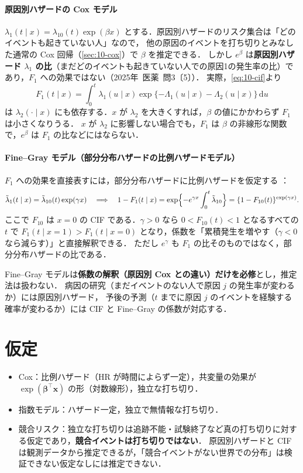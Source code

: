 \documentclass[a4paper,11pt,openany]{ltjsbook}
\newcommand{\kakomon}[2]{\mbox{#1年 医薬 問#2}}
\newcommand{\dd}{\mathrm{d}}
\newcommand{\transp}{^{\top}}
\begin{document}
\paragraph{原因別ハザードの Cox モデル}
$\lambda_1(t\mid x)=\lambda_{10}(t)\exp(\beta x)$ とする．原因別ハザードのリスク集合は「どのイベントも起きていない人」なので，
他の原因のイベントを打ち切りとみなした通常の Cox 回帰（\cref{sec:10-cox}）で $\beta$ を推定できる．
しかし $e^\beta$ は\textbf{原因別ハザード $\lambda_1$ の比}（まだどのイベントも起きていない人での原因1の発生率の比）であり，$F_1$ への効果ではない（\kakomon{2025}{3}〔5〕）．
実際，\cref{eq:10-cif}より
\[
F_1(t\mid x)=\int_0^t\lambda_1(u\mid x)\exp\{-\Lambda_1(u\mid x)-\Lambda_2(u\mid x)\}\,\dd u
\]
は $\lambda_2(\cdot\mid x)$ にも依存する．$x$ が $\lambda_2$ を大きくすれば，$\beta$ の値にかかわらず $F_1$ は小さくなりうる．
$x$ が $\lambda_2$ に影響しない場合でも，$F_1$ は $\beta$ の非線形な関数で，$e^\beta$ は $F_1$ の比などにはならない．

\paragraph{Fine--Gray モデル（部分分布ハザードの比例ハザードモデル）}
$F_1$ への効果を直接表すには，部分分布ハザードに比例ハザードを仮定する \cite{finegray1999}：
\[
\tilde\lambda_1(t\mid x)=\tilde\lambda_{10}(t)\exp(\gamma x)
\quad\Longrightarrow\quad
1-F_1(t\mid x)=\exp\Bigl\{-e^{\gamma x}\int_0^t\tilde\lambda_{10}\Bigr\}=\{1-F_{10}(t)\}^{\exp(\gamma x)}.
\]
ここで $F_{10}$ は $x=0$ の CIF である．$\gamma>0$ なら $0<F_{10}(t)<1$ となるすべての $t$ で $F_1(t\mid x=1)>F_1(t\mid x=0)$ となり，係数を「累積発生を増やす（$\gamma<0$ なら減らす）」と直接解釈できる．
ただし $e^\gamma$ も $F_1$ の比そのものではなく，部分分布ハザードの比である．
\begin{pointbox}[本書での扱い]
Fine--Gray モデルは\textbf{係数の解釈（原因別 Cox との違い）だけを必修}とし，推定法は扱わない．
病因の研究（まだイベントのない人で原因 $j$ の発生率が変わるか）には原因別ハザード，
予後の予測（$t$ までに原因 $j$ のイベントを経験する確率が変わるか）には CIF と Fine--Gray の係数が対応する．
\end{pointbox}

\section{仮定}\label{sec:10-assump}
\begin{itemize}
\item Cox：比例ハザード（HR が時間によらず一定），共変量の効果が $\exp(\bm\beta\transp\bm x)$ の形（対数線形），独立な打ち切り．
\item 指数モデル：ハザード一定，独立で無情報な打ち切り．
\item 競合リスク：独立な打ち切りは追跡不能・試験終了など真の打ち切りに対する仮定であり，\textbf{競合イベントは打ち切りではない}．
      原因別ハザードと CIF は観測データから推定できるが，「競合イベントがない世界での分布」は検証できない仮定なしには推定できない．
\end{itemize}
\end{document}

